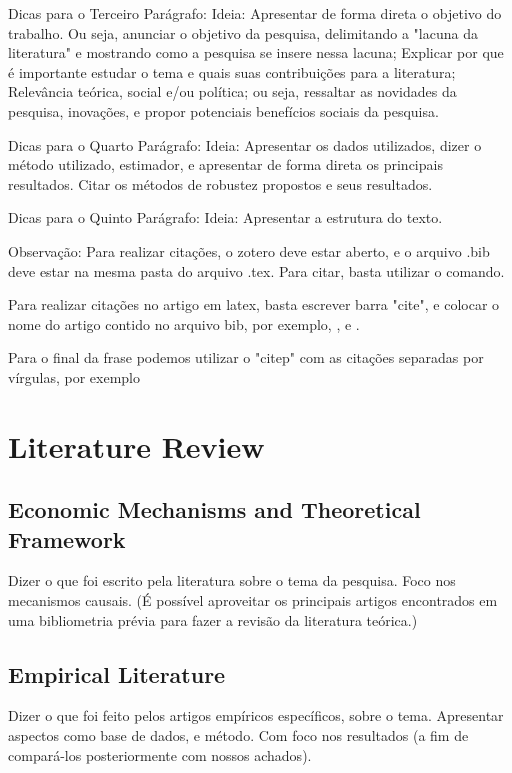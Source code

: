 \documentclass[a4paper]{article}
\begin{document}
Dicas para o Terceiro Parágrafo: Ideia: Apresentar de forma direta o objetivo do trabalho. Ou seja, anunciar o objetivo da pesquisa, delimitando a "lacuna da literatura" e mostrando como a pesquisa se insere nessa lacuna; Explicar por que é importante estudar o tema e quais suas contribuições para a literatura; Relevância teórica, social e/ou política; ou seja, ressaltar as novidades da pesquisa, inovações, e propor potenciais benefícios sociais da pesquisa.

Dicas para o Quarto Parágrafo: Ideia: Apresentar os dados utilizados, dizer o método utilizado, estimador, e apresentar de forma direta os principais resultados. Citar os métodos de robustez propostos e seus resultados.

Dicas para o Quinto Parágrafo: Ideia: Apresentar a estrutura do texto.

Observação: Para realizar citações, o zotero deve estar aberto, e o arquivo .bib deve estar na mesma pasta do arquivo .tex. Para citar, basta utilizar o comando.

Para realizar citações no artigo em latex, basta escrever barra "cite", e colocar o nome do artigo contido no arquivo bib, por exemplo, \cite{hadash2018estimate}, \cite{kour2014fast} e \cite{kour2014real}.

Para o final da frase podemos utilizar o "citep" com as citações separadas por vírgulas, por exemplo \citep{hadash2018estimate, kour2014fast}

\section{Literature Review}

\subsection{Economic Mechanisms and Theoretical Framework}

Dizer o que foi escrito pela literatura sobre o tema da pesquisa. Foco nos mecanismos causais. (É possível aproveitar os principais artigos encontrados em uma bibliometria prévia para fazer a revisão da literatura teórica.)

\subsection{Empirical Literature}

Dizer o que foi feito pelos artigos empíricos específicos, sobre o tema. Apresentar aspectos como base de dados, e método. Com foco nos resultados (a fim de compará-los posteriormente com nossos achados).
\end{document}
